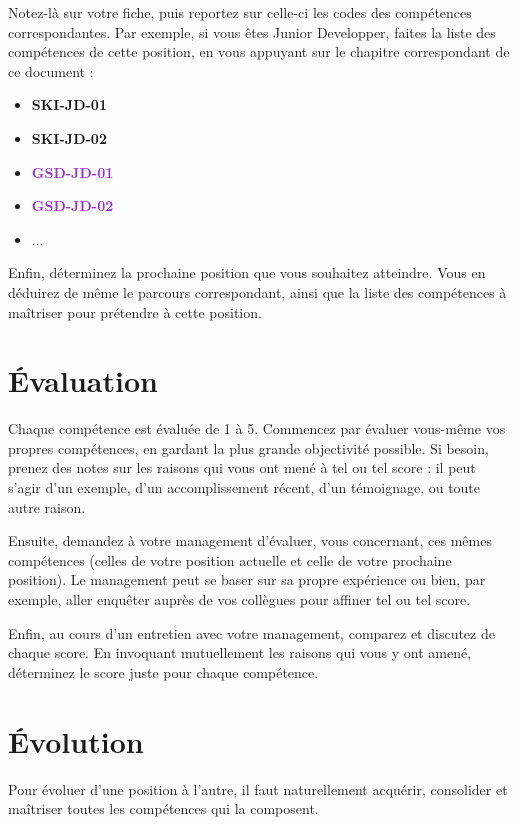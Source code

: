 \documentclass[a4paper, french, openany, 12pt]{book}
\newcommand\dex[1]{\textcolor{BrickRed}{\textbf{\uppercase{ski-{#1}}}}}
\newcommand\str[1]{\textcolor{DarkOrchid}{\textbf{\uppercase{gsd-{#1}}}}}
\begin{document}
\begin{multicols}{2}
  Notez-là sur votre fiche, puis reportez sur celle-ci les codes des compétences correspondantes.
  Par exemple, si vous êtes Junior Developper, faites la liste des compétences de cette position, en vous appuyant sur
  le chapitre correspondant de ce document :

  \begin{itemize}
    \item \dex{jd-01}
    \item \dex{jd-02}
    \item \str{jd-01}
    \item \str{jd-02}
    \item ...
  \end{itemize}

  Enfin, déterminez la prochaine position que vous souhaitez atteindre.
  Vous en déduirez de même le parcours correspondant, ainsi que la liste des compétences à maîtriser pour prétendre
  à cette position.

  \section*{Évaluation}

  Chaque compétence est évaluée de 1 à 5.
  Commencez par évaluer vous-même vos propres compétences, en gardant la plus grande objectivité possible.
  Si besoin, prenez des notes sur les raisons qui vous ont mené à tel ou tel score : il peut s'agir d'un exemple,
  d'un accomplissement récent, d'un témoignage, ou toute autre raison.

  Ensuite, demandez à votre management d'évaluer, vous concernant, ces mêmes compétences (celles de votre position
  actuelle et celle de votre prochaine position).
  Le management peut se baser sur sa propre expérience ou bien, par exemple, aller enquêter auprès de vos collègues
  pour affiner tel ou tel score.

  Enfin, au cours d'un entretien avec votre management, comparez et discutez de chaque score.
  En invoquant mutuellement les raisons qui vous y ont amené, déterminez le score juste pour chaque compétence.

  \section*{Évolution}

  Pour évoluer d'une position à l'autre, il faut naturellement acquérir, consolider et maîtriser toutes les compétences
  qui la composent.


\end{multicols}
\end{document}
